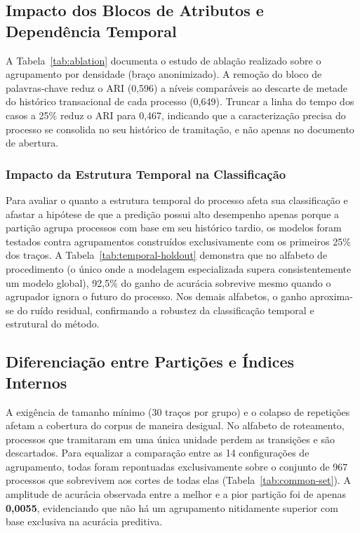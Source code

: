

\subsection{Impacto dos Blocos de Atributos e Dependência Temporal}\label{sec:res-blocos}

A Tabela~\ref{tab:ablation} documenta o estudo de ablação realizado sobre o agrupamento por densidade (braço anonimizado). A remoção do bloco de palavras-chave reduz o ARI (0,596) a níveis comparáveis ao descarte de metade do histórico transacional de cada processo (0,649). Truncar a linha do tempo dos casos a 25\% reduz o ARI para 0,467, indicando que a caracterização precisa do processo se consolida no seu histórico de tramitação, e não apenas no documento de abertura.



\subsubsection{Impacto da Estrutura Temporal na Classificação}\label{sec:res-holdout}

Para avaliar o quanto a estrutura temporal do processo afeta sua classificação e afastar a hipótese de que a predição possui alto desempenho apenas porque a partição agrupa processos com base em seu histórico tardio, os modelos foram testados contra agrupamentos construídos exclusivamente com os primeiros 25\% dos traços. A Tabela~\ref{tab:temporal-holdout} demonstra que no alfabeto de procedimento (o único onde a modelagem especializada supera consistentemente um modelo global), 92,5\% do ganho de acurácia sobrevive mesmo quando o agrupador ignora o futuro do processo. Nos demais alfabetos, o ganho aproxima-se do ruído residual, confirmando a robustez da classificação temporal e estrutural do método.



\subsection{Diferenciação entre Partições e Índices Internos}\label{sec:res-particoes}

A exigência de tamanho mínimo (30 traços por grupo) e o colapso de repetições afetam a cobertura do corpus de maneira desigual. No alfabeto de roteamento, processos que tramitaram em uma única unidade perdem as transições e são descartados. Para equalizar a comparação entre as 14 configurações de agrupamento, todas foram repontuadas exclusivamente sobre o conjunto de 967 processos que sobrevivem aos cortes de todas elas (Tabela~\ref{tab:common-set}). A amplitude de acurácia observada entre a melhor e a pior partição foi de apenas \textbf{0,0055}, evidenciando que não há um agrupamento nitidamente superior com base exclusiva na acurácia preditiva.

